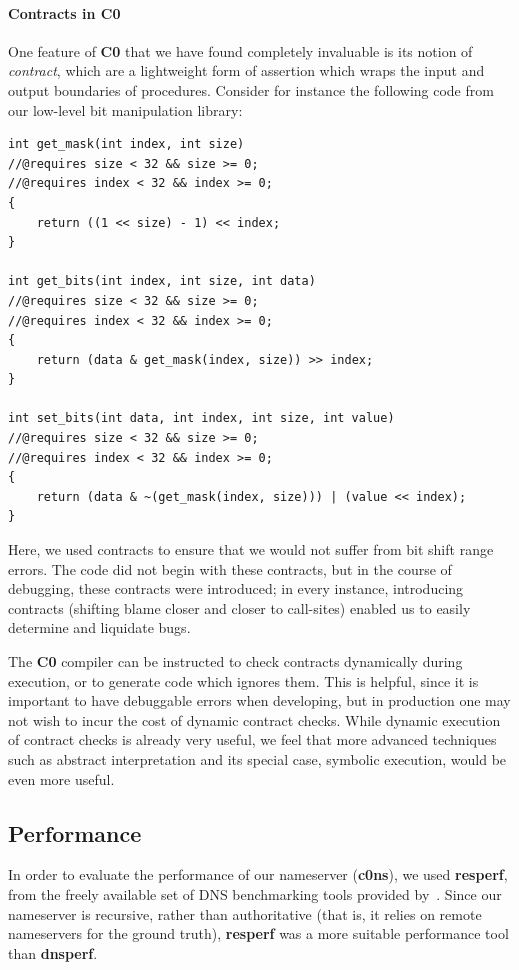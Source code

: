 \documentclass{article}
\newcommand\Kwd[1]{{\sffamily\bfseries{#1}}}
\begin{document}
\paragraph{Contracts in \Kwd{C0}}

One feature of \Kwd{C0} that we have found completely invaluable is
its notion of \emph{contract}, which are a lightweight form of
assertion which wraps the input and output boundaries of
procedures. Consider for instance the following code from our
low-level bit manipulation library:

\begin{lstlisting}
int get_mask(int index, int size)
//@requires size < 32 && size >= 0;
//@requires index < 32 && index >= 0;
{
    return ((1 << size) - 1) << index;
}

int get_bits(int index, int size, int data)
//@requires size < 32 && size >= 0;
//@requires index < 32 && index >= 0;
{
    return (data & get_mask(index, size)) >> index;
}

int set_bits(int data, int index, int size, int value)
//@requires size < 32 && size >= 0;
//@requires index < 32 && index >= 0;
{
    return (data & ~(get_mask(index, size))) | (value << index);
}
\end{lstlisting}

Here, we used contracts to ensure that we would not suffer from bit
shift range errors. The code did not begin with these contracts, but
in the course of debugging, these contracts were introduced; in every
instance, introducing contracts (shifting blame closer and closer to
call-sites) enabled us to easily determine and liquidate bugs.

The \Kwd{C0} compiler can be instructed to check contracts dynamically
during execution, or to generate code which ignores them. This is
helpful, since it is important to have debuggable errors when
developing, but in production one may not wish to incur the cost of
dynamic contract checks. While dynamic execution of contract checks
is already very useful, we feel that more advanced techniques such as
abstract interpretation and its special case, symbolic execution,
would be even more useful.

\subsection{Performance}\label{sec:performance}

In order to evaluate the performance of our nameserver (\Kwd{c0ns}), we used \Kwd{resperf}, from the freely available set of DNS benchmarking tools provided by~\cite{github:dnsperf2}. Since our nameserver is recursive, rather than authoritative (that is, it relies on remote nameservers for the ground truth), \Kwd{resperf} was a more suitable performance tool than \Kwd{dnsperf}.
\end{document}
